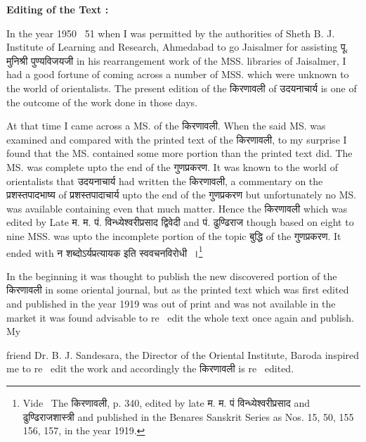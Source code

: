 \documentclass[11pt, openany]{book}
\begin{document}
\noindent
\textbf{Editing of the Text :}

In the year 1950 \textendash\ 51 when I was permitted by the authorities of Sheth B. J. Institute of Learning and Research, Ahmedabad to go Jaisalmer for assisting पू. मुनिश्री पुण्यविजयजी in his rearrangement work of the MSS. libraries of Jaisalmer, I had a good fortune of coming across a number of MSS. which were unknown to the world of orientalists. The present edition of the किरणावली of उदयनाचार्य is one of the outcome of the work done in those days.

At that time I came across a MS. of the किरणावली. When the said MS. was examined and compared with the printed text of the किरणावली, to my surprise I found that the MS. contained some more portion than the printed text did. The MS. was complete upto the end of the गुणप्रकरण. It was known to the world of orientalists that उदयनाचार्य had written the किरणावली, a commentary on the प्रशस्तपादभाष्य of प्रशस्तपादाचार्य upto the end of the गुणप्रकरण but unfortunately no MS. was available containing even that much matter. Hence the किरणावली which was edited by Late म. म. पं. विन्ध्येश्वरीप्रसाद द्विवेदी and पं. ढुण्ढिराज though based on eight to nine MSS. was upto the incomplete portion of the topic बुद्धि of the गुणप्रकरण. It ended with न शब्दोऽर्यप्रत्यायक इति स्ववचनविरोधी~।\renewcommand{\thefootnote}{1}\footnote{Vide \textendash\ The किरणावली, p. 340, edited by late म. म. पं विन्ध्येश्वरीप्रसाद and ढुण्ढिराजशास्त्री and published in the Benares Sanskrit Series as Nos. 15, 50, 155 156, 157, in the year 1919.}

In the beginning it was thought to publish the new discovered portion of the किरणावली in some oriental journal, but as the printed text which was first edited and published in the year 1919 was out of print and was not available in the market it was found advisable to re \textendash\ edit the whole text once again and publish. My

\afterpage{\fancyhead[CE,CO]{\thepage}}
\cfoot{}
\newpage
\renewcommand{\thepage}{\roman{page}}
\setcounter{page}{2}

\noindent
friend Dr. B. J. Sandesara, the Director of the Oriental Institute, Baroda inspired me to re \textendash\ edit the work and accordingly the किरणावली is re \textendash\ edited.
\end{document}
